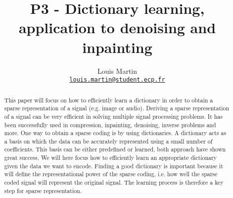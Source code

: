 \documentclass[a4paper,11pt]{article}
\title{P3 - Dictionary learning, application to denoising and inpainting}
\author{
  Louis Martin\\
  \href{mailto:louis.martin@student.ecp.fr}{\tt louis.martin@student.ecp.fr}
}
\begin{document}
\maketitle

\begin{abstract}
This paper will focus on how to efficiently learn a dictionary in order to obtain a sparse representation of a signal (e.g. image or audio).
Deriving a sparse representation of a signal can be very efficient in solving multiple signal processing problems.
It has been successfully used in compression, inpainting, denoising, inverse problems and more.
One way to obtain a sparse coding is by using dictionaries.
A dictionary acts as a basis on which the data can be accurately represented using a small number of coefficients.
This basis can be either predefined or learned, both approach have shown great success.
We will here focus how to efficiently learn an appropriate dictionary given the data we want to encode.
Finding a good dictionary is important because it will define the representational power of the sparse coding,
i.e. how well the sparse coded signal will represent the original signal.
The learning process is therefore a key step for sparse representation.

\end{abstract}
\end{document}
